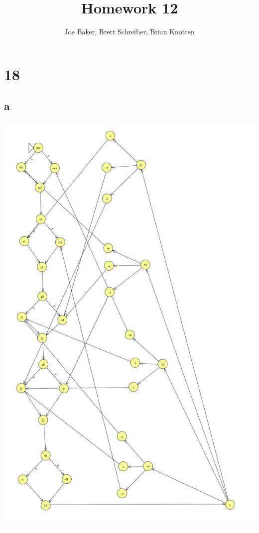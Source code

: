 \documentclass[letterpaper,notitlepage,twoside]{article}
\begin{document}
\title{Homework 12}
\author{Joe Baker, Brett Schreiber, Brian Knotten}
\maketitle

\section*{18}
\subsection*{a}
\includegraphics[scale = 0.41] {notsorted}
\end{document}
